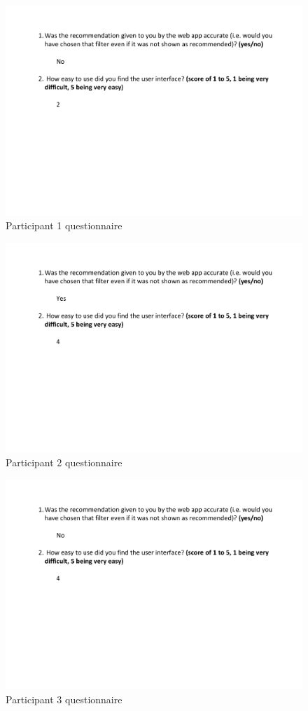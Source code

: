 \documentclass[a4paper,12pt]{report}
\begin{document}
\begin{appendices}
    \begin{figure}[h]
      \centering
      \includegraphics[width=0.9\linewidth]{questionnaire-1}
      \caption{Participant 1 questionnaire}
    \end{figure}

    \begin{figure}[h]
      \centering
      \includegraphics[width=0.9\linewidth]{questionnaire-2}
      \caption{Participant 2 questionnaire}
    \end{figure}

    \begin{figure}[h]
      \centering
      \includegraphics[width=0.9\linewidth]{questionnaire-3}
      \caption{Participant 3 questionnaire}
    \end{figure}


\end{appendices}
\end{document}
